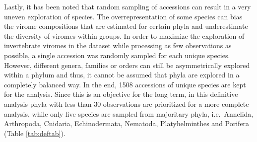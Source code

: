 \documentclass[
  openany]{book}
\begin{document}
Lastly, it has been noted that random sampling of accessions can result in a very uneven exploration of species. The overrepresentation of some species can bias the virome compositions that are estimated for certain phyla and underestimate the diversity of viromes within groups. In order to maximize the exploration of invertebrate viromes in the dataset while processing as few observations as possible, a single accession was randomly sampled for each unique species. However, different genera, families or orders can still be asymmetrically explored within a phylum and thus, it cannot be assumed that phyla are explored in a completely balanced way. In the end,
1508 accessions of unique species are kept for the analysis. Since this is an objective for the long term, in this definitive analysis phyla with less than 30 observations are prioritized for a more complete analysis, while only five species are sampled from majoritary phyla, i.e.~Annelida, Arthropoda, Cnidaria, Echinodermata, Nematoda, Platyhelminthes and Porifera (Table \ref{tab:deftab}).
\end{document}
